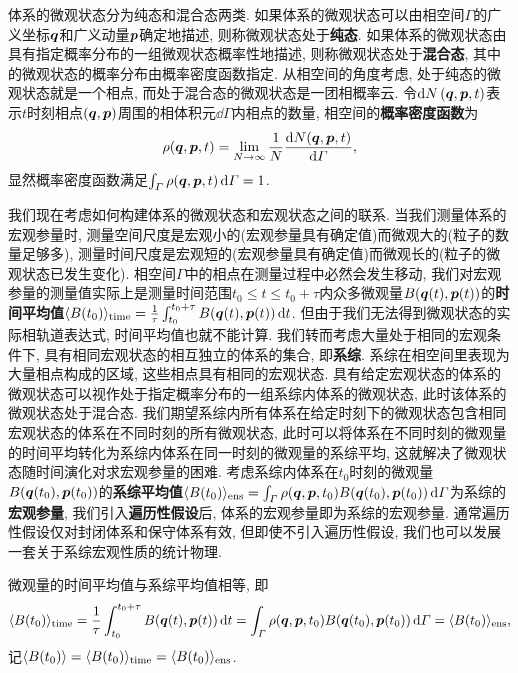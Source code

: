 体系的微观状态分为纯态和混合态两类. 如果体系的微观状态可以由相空间$ \varGamma $的广义坐标$ \vb*{q} $和广义动量$ \vb*{p} $确定地描述, 则称微观状态处于\textbf{纯态}. 如果体系的微观状态由具有指定概率分布的一组微观状态概率性地描述, 则称微观状态处于\textbf{混合态}, 其中的微观状态的概率分布由概率密度函数指定. 从相空间的角度考虑, 处于纯态的微观状态就是一个相点, 而处于混合态的微观状态是一团相概率云. 令$ \dd{N}(\vb*{q},\vb*{p},t) $表示$ t $时刻相点$ (\vb*{q},\vb*{p}) $周围的相体积元$ \dd{\varGamma} $内相点的数量, 相空间的\textbf{概率密度函数}为
\begin{equation}
    \rho(\vb*{q},\vb*{p},t) = \lim_{N \to \infty} \frac{1}{N}\dv{N(\vb*{q},\vb*{p},t)}{\varGamma},
\end{equation}
显然概率密度函数满足$ \int_{\varGamma} \rho(\vb*{q},\vb*{p},t) \dd{\varGamma} =1 $.

我们现在考虑如何构建体系的微观状态和宏观状态之间的联系. 当我们测量体系的宏观参量时, 测量空间尺度是宏观小的(宏观参量具有确定值)而微观大的(粒子的数量足够多), 测量时间尺度是宏观短的(宏观参量具有确定值)而微观长的(粒子的微观状态已发生变化). 相空间$ \varGamma $中的相点在测量过程中必然会发生移动, 我们对宏观参量的测量值实际上是测量时间范围$ t_0 \leq t \leq t_0 + \tau $内众多微观量$ B(\vb*{q}(t),\vb*{p}(t)) $的\textbf{时间平均值}$ \langle B(t_0) \rangle_{\mathrm{time}} = \frac{1}{\tau} \int_{t_0}^{t_0+\tau} B(\vb*{q}(t),\vb*{p}(t))\dd{t} $. 但由于我们无法得到微观状态的实际相轨道表达式, 时间平均值也就不能计算. 我们转而考虑大量处于相同的宏观条件下, 具有相同宏观状态的相互独立的体系的集合, 即\textbf{系综}. 系综在相空间里表现为大量相点构成的区域, 这些相点具有相同的宏观状态. 具有给定宏观状态的体系的微观状态可以视作处于指定概率分布的一组系综内体系的微观状态, 此时该体系的微观状态处于混合态. 我们期望系综内所有体系在给定时刻下的微观状态包含相同宏观状态的体系在不同时刻的所有微观状态, 此时可以将体系在不同时刻的微观量的时间平均转化为系综内体系在同一时刻的微观量的系综平均, 这就解决了微观状态随时间演化对求宏观参量的困难. 考虑系综内体系在$ t_0 $时刻的微观量$ B(\vb*{q}(t_0),\vb*{p}(t_0)) $的\textbf{系综平均值}$ \langle B(t_0) \rangle_{\mathrm{ens}} = \int_{\varGamma} \rho(\vb*{q},\vb*{p},t_0) B(\vb*{q}(t_0),\vb*{p}(t_0)) \dd{\varGamma} $为系综的\textbf{宏观参量}, 我们引入\textbf{遍历性假设}后, 体系的宏观参量即为系综的宏观参量. 通常遍历性假设仅对封闭体系和保守体系有效, 但即使不引入遍历性假设, 我们也可以发展一套关于系综宏观性质的统计物理.

\begin{postulate}[遍历性假设]\label{pos:遍历性假设}
    微观量的时间平均值与系综平均值相等, 即
    \begin{equation}
        \langle B(t_0) \rangle_{\mathrm{time}} = \frac{1}{\tau} \int_{t_0}^{t_0+\tau} B(\vb*{q}(t),\vb*{p}(t))\dd{t} = \int_{\varGamma} \rho(\vb*{q},\vb*{p},t_0) B(\vb*{q}(t_0),\vb*{p}(t_0)) \dd{\varGamma} = \langle B(t_0) \rangle_{\mathrm{ens}},
    \end{equation}
    记$ \langle B(t_0)\rangle = \langle B(t_0) \rangle_{\mathrm{time}} = \langle B(t_0) \rangle_{\mathrm{ens}} $.
\end{postulate}

